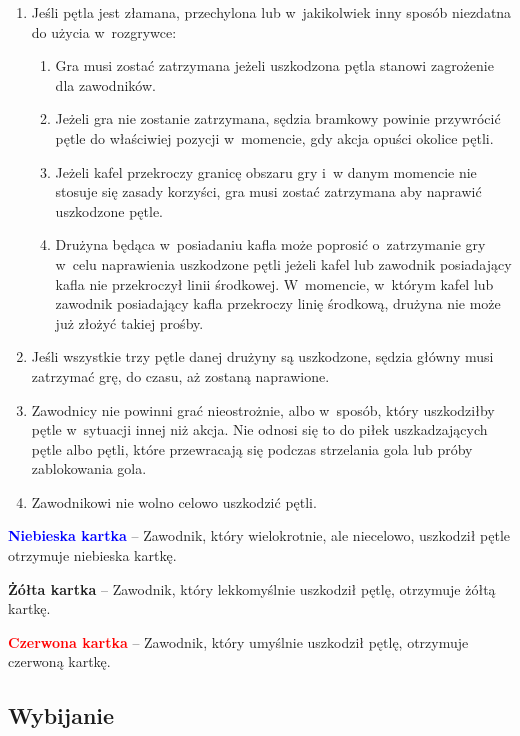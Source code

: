 \documentclass[12pt]{article}
\newcommand\redcard[1]{\bgroup\textcolor{red}{\textbf{#1}}}
\newcommand\yellowcard[1]{\bgroup\textcolor{darkyellow}{\textbf{#1}}}
\newcommand\bluecard[1]{\bgroup\textcolor{blue}{\textbf{#1}}}
\begin{document}
\begin{enumerate}
	\item
	      Jeśli pętla jest złamana, przechylona lub w~jakikolwiek inny sposób
	      niezdatna do użycia w~rozgrywce:

	      \begin{enumerate}
		      \item
		            Gra musi zostać zatrzymana jeżeli uszkodzona pętla stanowi
		            zagrożenie dla zawodników.
		      \item
		            Jeżeli gra nie zostanie zatrzymana, sędzia bramkowy powinie
		            przywrócić pętle do właściwiej pozycji w~momencie, gdy akcja opuści
		            okolice pętli.
		      \item
		            Jeżeli kafel przekroczy granicę obszaru gry i~w danym momencie nie
		            stosuje się zasady korzyści, gra musi zostać zatrzymana aby naprawić
		            uszkodzone pętle.
		      \item
		            Drużyna będąca w~posiadaniu kafla może poprosić o~zatrzymanie gry w~celu naprawienia uszkodzone pętli jeżeli kafel lub zawodnik
		            posiadający kafla nie przekroczył linii środkowej. W~momencie, w~którym kafel lub zawodnik posiadający kafla przekroczy linię
		            środkową, drużyna nie może już złożyć takiej prośby.
	      \end{enumerate}
	\item
	      Jeśli wszystkie trzy pętle danej drużyny są uszkodzone, sędzia główny
	      musi zatrzymać grę, do czasu, aż zostaną naprawione.
	\item
	      Zawodnicy nie powinni grać nieostrożnie, albo w~sposób, który
	      uszkodziłby pętle w~sytuacji innej niż akcja. Nie odnosi się to do
	      piłek uszkadzających pętle albo pętli, które przewracają się podczas
	      strzelania gola lub próby zablokowania gola.
	\item
	      Zawodnikowi nie wolno celowo uszkodzić pętli.
\end{enumerate}

\bluecard{Niebieska kartka} -- Zawodnik, który wielokrotnie, ale niecelowo,
uszkodził pętle otrzymuje niebieska kartkę.

\yellowcard{Żółta kartka} -- Zawodnik, który lekkomyślnie uszkodził pętlę,
otrzymuje żółtą kartkę.

\redcard{Czerwona kartka} -- Zawodnik, który umyślnie uszkodził
pętlę, otrzymuje czerwoną kartkę.

\subsection{Wybijanie}
\end{document}
